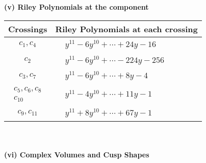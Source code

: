 \documentclass[1p]{elsarticle_modified}
\theoremstyle{definition}
\begin{document}
\flushleft \textbf{(v) Riley Polynomials at the component}\newline \\
\begin{tabular}{m{50pt}|m{274pt}}
Crossings & \hspace{64pt}Riley Polynomials at each crossing \\
\hline $$\begin{aligned}c_{1},c_{4}\end{aligned}$$&$\begin{aligned}
&y^{11}-6 y^{10}+\cdots+24 y-16
\end{aligned}$\\
\hline $$\begin{aligned}c_{2}\end{aligned}$$&$\begin{aligned}
&y^{11}-6 y^{10}+\cdots-224 y-256
\end{aligned}$\\
\hline $$\begin{aligned}c_{3},c_{7}\end{aligned}$$&$\begin{aligned}
&y^{11}-6 y^{10}+\cdots+8 y-4
\end{aligned}$\\
\hline $$\begin{aligned}c_{5},c_{6},c_{8}\\c_{10}\end{aligned}$$&$\begin{aligned}
&y^{11}-4 y^{10}+\cdots+11 y-1
\end{aligned}$\\
\hline $$\begin{aligned}c_{9},c_{11}\end{aligned}$$&$\begin{aligned}
&y^{11}+8 y^{10}+\cdots+67 y-1
\end{aligned}$\\
\hline
\end{tabular}\\~\\
\newpage\flushleft \textbf{(vi) Complex Volumes and Cusp Shapes}
\end{document}
